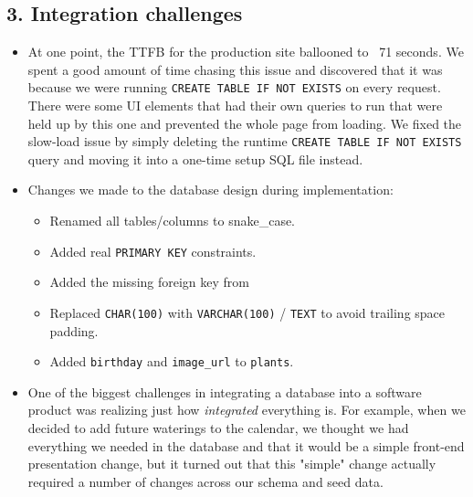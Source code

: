 \documentclass[11pt]{article}
\begin{document}
\subsection*{3. Integration challenges}
\begin{itemize}[leftmargin=*]
    \item At one point, the TTFB for the production site ballooned to ~71 seconds. We spent a good amount of time chasing this issue and discovered that it was because we were running \texttt{CREATE TABLE IF NOT EXISTS} on every request. There were some UI elements that had their own queries to run that were held up by this one and prevented the whole page from loading. We fixed the slow-load issue by simply deleting the runtime \texttt{CREATE TABLE IF NOT EXISTS} query and moving it into a one-time setup SQL file instead.
  \item Changes we made to the database design during implementation:
  \begin{itemize}
    \item Renamed all tables/columns to snake\_case.
    \item Added real \texttt{PRIMARY KEY} constraints.
    \item Added the missing foreign key from \
    \item Replaced \texttt{CHAR(100)} with \texttt{VARCHAR(100)} / \texttt{TEXT} to avoid trailing
      space padding.
    \item Added \texttt{birthday} and \texttt{image\_url} to \texttt{plants}.
  \end{itemize}
  \item One of the biggest challenges in integrating a database into a software product was realizing just how \textit{integrated} everything is. For example, when we decided to add future waterings to the calendar, we thought we had everything we needed in the database and that it would be a simple front-end presentation change, but it turned out that this "simple" change actually required a number of changes across our schema and seed data.
\end{itemize}
\end{document}

